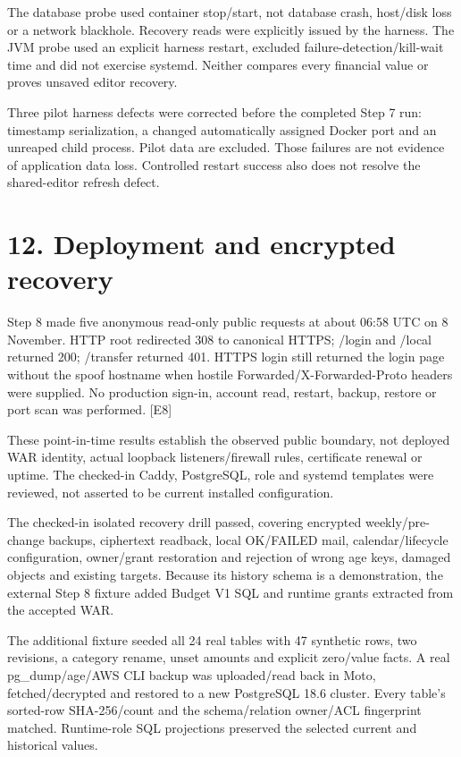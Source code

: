 \documentclass[11pt,a4paper]{article}
\begin{document}
The database probe used container stop/\allowbreak{}start, not database crash, host/\allowbreak{}disk loss or a network blackhole. Recovery reads were explicitly issued by the harness. The JVM probe used an explicit harness restart, excluded failure-detection/\allowbreak{}kill-wait time and did not exercise systemd. Neither compares every financial value or proves unsaved editor recovery.

Three pilot harness defects were corrected before the completed Step 7 run: timestamp serialization, a changed automatically assigned Docker port and an unreaped child process. Pilot data are excluded. Those failures are not evidence of application data loss. Controlled restart success also does not resolve the shared-editor refresh defect.

\section*{12. Deployment and encrypted recovery}

Step 8 made five anonymous read-only public requests at about 06:58 UTC on 8 November. HTTP root redirected 308 to canonical HTTPS; /\allowbreak{}login and /\allowbreak{}local returned 200; /\allowbreak{}transfer returned 401. HTTPS login still returned the login page without the spoof hostname when hostile Forwarded/\allowbreak{}X-Forwarded-Proto headers were supplied. No production sign-in, account read, restart, backup, restore or port scan was performed. [E8]

These point-in-time results establish the observed public boundary, not deployed WAR identity, actual loopback listeners/\allowbreak{}firewall rules, certificate renewal or uptime. The checked-in Caddy, PostgreSQL, role and systemd templates were reviewed, not asserted to be current installed configuration.

The checked-in isolated recovery drill passed, covering encrypted weekly/\allowbreak{}pre-change backups, ciphertext readback, local OK/\allowbreak{}FAILED mail, calendar/\allowbreak{}lifecycle configuration, owner/\allowbreak{}grant restoration and rejection of wrong age keys, damaged objects and existing targets. Because its history schema is a demonstration, the external Step 8 fixture added Budget V1 SQL and runtime grants extracted from the accepted WAR.

The additional fixture seeded all 24 real tables with 47 synthetic rows, two revisions, a category rename, unset amounts and explicit zero/\allowbreak{}value facts. A real pg\_dump/\allowbreak{}age/\allowbreak{}AWS CLI backup was uploaded/\allowbreak{}read back in Moto, fetched/\allowbreak{}decrypted and restored to a new PostgreSQL 18.6 cluster. Every table's sorted-row SHA-256/\allowbreak{}count and the schema/\allowbreak{}relation owner/\allowbreak{}ACL fingerprint matched. Runtime-role SQL projections preserved the selected current and historical values.
\end{document}
